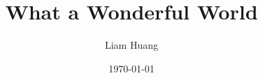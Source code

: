 \documentclass[UTF8]{ctexart}
\title{What a Wonderful World}
\author{Liam Huang}
\date{\today}
\begin{document}
\begin{multicols}{2}
\end{multicols}
\end{document}
